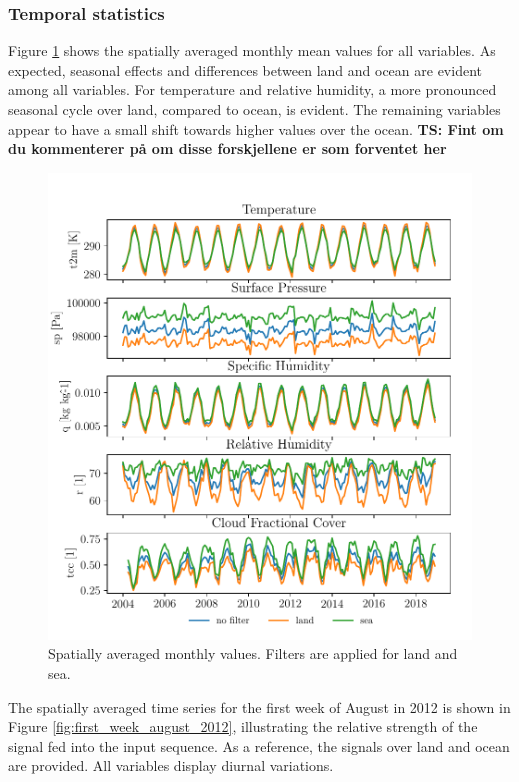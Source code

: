 \subsubsection{Temporal statistics}
Figure \ref{fig:monthly_mean_ts_vars} shows the spatially averaged monthly mean values for all variables. As expected, seasonal effects and differences between land and ocean are evident among all variables. For temperature and relative humidity, a more pronounced seasonal cycle over land, compared to ocean, is evident. The remaining variables appear to have a small shift towards higher values over the ocean. \textbf{TS: Fint om du kommenterer på om disse forskjellene er som forventet her}
\begin{figure}[ht]
    \centering
    \includegraphics{python_figs/monthly_means.pdf}
    \caption{Spatially averaged monthly values. Filters are applied for land and sea.}
    \label{fig:monthly_mean_ts_vars}
\end{figure}

The spatially averaged time series for the first week of August in 2012 is shown in Figure \ref{fig:first_week_august_2012}, illustrating the relative strength of the signal fed into the input sequence. As a reference, the signals over land and ocean are provided. All variables display diurnal variations. 

